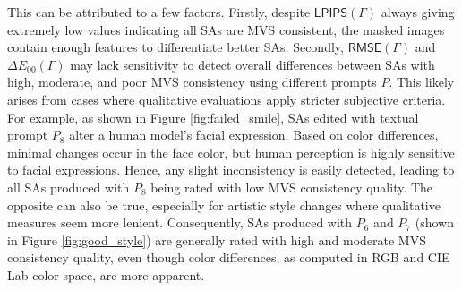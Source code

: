 This can be attributed to a few factors. Firstly, despite $\mathsf{LPIPS}(\varGamma)$ always giving extremely low values indicating all SAs are MVS consistent, the masked images contain enough features to differentiate better SAs. Secondly, $\mathsf{RMSE}(\varGamma)$ and $\Delta E_{00}(\varGamma)$ may lack sensitivity to detect overall differences between SAs with high, moderate, and poor MVS consistency using different prompts $P$. This likely arises from cases where qualitative evaluations apply stricter subjective criteria. For example, as shown in Figure \ref{fig:failed_smile}, SAs edited with textual prompt $P_8$ alter a human model's facial expression. Based on color differences, minimal changes occur in the face color, but human perception is highly sensitive to facial expressions. Hence, any slight inconsistency is easily detected, leading to all SAs produced with $P_8$ being rated with low MVS consistency quality. The opposite can also be true, especially for artistic style changes where qualitative measures seem more lenient. Consequently, SAs produced with $P_6$ and $P_7$ (shown in Figure \ref{fig:good_style}) are generally rated with high and moderate MVS consistency quality, even though color differences, as computed in RGB and CIE Lab color space, are more apparent.

